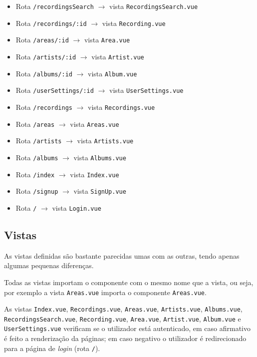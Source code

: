 \documentclass{article}
\begin{document}
\begin{itemize}
    \item Rota \texttt{/recordingsSearch} $\to$ vista \texttt{RecordingsSearch.vue}
    \item Rota \texttt{/recordings/:id} $\to$ vista \texttt{Recording.vue}
    \item Rota \texttt{/areas/:id} $\to$ vista \texttt{Area.vue}
    \item Rota \texttt{/artists/:id} $\to$ vista \texttt{Artist.vue}
    \item Rota \texttt{/albums/:id} $\to$ vista \texttt{Album.vue}
    \item Rota \texttt{/userSettings/:id} $\to$ vista \texttt{UserSettings.vue}
    \item Rota \texttt{/recordings} $\to$ vista \texttt{Recordings.vue}
    \item Rota \texttt{/areas} $\to$ vista \texttt{Areas.vue}
    \item Rota \texttt{/artists} $\to$ vista \texttt{Artists.vue}
    \item Rota \texttt{/albums} $\to$ vista \texttt{Albums.vue}
    \item Rota \texttt{/index} $\to$ vista \texttt{Index.vue}
    \item Rota \texttt{/signup} $\to$ vista \texttt{SignUp.vue}
    \item Rota \texttt{/} $\to$ vista \texttt{Login.vue}
\end{itemize}

\subsection{Vistas}

As vistas definidas são bastante parecidas umas com as outras, tendo apenas algumas pequenas diferenças. 

Todas as vistas importam o componente com o mesmo nome que a vista, ou seja, por exemplo a vista \texttt{Areas.vue} importa o componente \texttt{Areas.vue}.

As vistas \texttt{Index.vue}, \texttt{Recordings.vue}, \texttt{Areas.vue}, \texttt{Artists.vue}, \texttt{Albums.vue}, \texttt{RecordingsSearch.vue}, \texttt{Recording.vue}, \texttt{Area.vue}, \texttt{Artist.vue}, \texttt{Album.vue} e \texttt{UserSettings.vue} verificam se o utilizador está autenticado, em caso afirmativo é feito a renderização da páginas; em caso negativo o utilizador é redirecionado para a página de \textit{login} (rota \texttt{/}).
\end{document}
